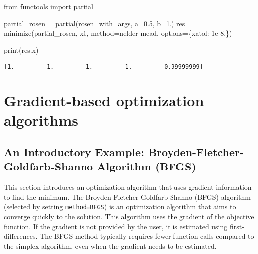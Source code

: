 \documentclass[
  letterpaper,
  DIV=11,
  numbers=noendperiod]{scrreprt}
\newenvironment{Shaded}{\begin{snugshade}}{\end{snugshade}}
\newcommand{\BuiltInTok}[1]{\textcolor[rgb]{0.00,0.23,0.31}{#1}}
\newcommand{\FloatTok}[1]{\textcolor[rgb]{0.68,0.00,0.00}{#1}}
\newcommand{\ImportTok}[1]{\textcolor[rgb]{0.00,0.46,0.62}{#1}}
\newcommand{\NormalTok}[1]{\textcolor[rgb]{0.00,0.23,0.31}{#1}}
\newcommand{\OperatorTok}[1]{\textcolor[rgb]{0.37,0.37,0.37}{#1}}
\newcommand{\StringTok}[1]{\textcolor[rgb]{0.13,0.47,0.30}{#1}}
\begin{document}
\begin{Shaded}
\begin{Highlighting}[]
\ImportTok{from}\NormalTok{ functools }\ImportTok{import}\NormalTok{ partial}

\NormalTok{partial\_rosen }\OperatorTok{=}\NormalTok{ partial(rosen\_with\_args, a}\OperatorTok{=}\FloatTok{0.5}\NormalTok{, b}\OperatorTok{=}\FloatTok{1.}\NormalTok{)}
\NormalTok{res }\OperatorTok{=}\NormalTok{ minimize(partial\_rosen, x0, method}\OperatorTok{=}\StringTok{\textquotesingle{}nelder{-}mead\textquotesingle{}}\NormalTok{,}
\NormalTok{               options}\OperatorTok{=}\NormalTok{\{}\StringTok{\textquotesingle{}xatol\textquotesingle{}}\NormalTok{: }\FloatTok{1e{-}8}\NormalTok{,\})}

\BuiltInTok{print}\NormalTok{(res.x)}
\end{Highlighting}
\end{Shaded}

\begin{verbatim}
[1.         1.         1.         1.         0.99999999]
\end{verbatim}

\section{Gradient-based optimization
algorithms}\label{gradient-based-optimization-algorithms}

\subsection{An Introductory Example: Broyden-Fletcher-Goldfarb-Shanno
Algorithm (BFGS)}\label{sec-bfgs-intro}

This section introduces an optimization algorithm that uses gradient
information to find the minimum. The Broyden-Fletcher-Goldfarb-Shanno
(BFGS) algorithm (selected by setting
\texttt{method=\textquotesingle{}BFGS\textquotesingle{}}) is an
optimization algorithm that aims to converge quickly to the solution.
This algorithm uses the gradient of the objective function. If the
gradient is not provided by the user, it is estimated using
first-differences. The BFGS method typically requires fewer function
calls compared to the simplex algorithm, even when the gradient needs to
be estimated.
\end{document}
